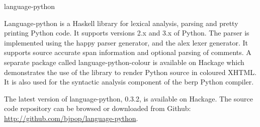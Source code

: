 \documentclass{scrreprt}
\begin{document}
\begin{hcarentry}{language-python}
\makeheader

Language-python is a Haskell library for lexical analysis,
parsing and pretty printing Python code. It supports versions 2.x
and 3.x of Python. The parser is implemented using the happy
parser generator, and the alex lexer generator.
It supports source accurate span information and optional parsing of
comments. A separate package called language-python-colour is available
on Hackage which demonstrates the use of the library to render
Python source in coloured XHTML.
It is also used for the syntactic analysis component of the berp
Python compiler.

\FurtherReading
The latest version of language-python, 0.3.2, is available on Hackage.
The source code repository can be browsed or downloaded from Github:
\url{http://github.com/bjpop/language-python}.

\end{hcarentry}
\end{document}
